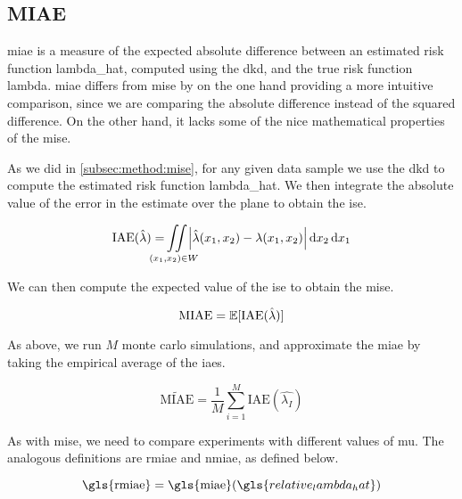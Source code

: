 \subsection{MIAE}
\label{subsec:method:miae}

\Gls{miae} is a measure of the expected absolute difference between an estimated risk function \gls{lambda_hat},
computed using the \gls{dkd}, and the true risk function \gls{lambda}.
\Gls{miae} differs from \gls{mise} by on the one hand providing a more intuitive comparison,
since we are comparing the absolute difference instead of the squared difference.
On the other hand, it lacks some of the nice mathematical properties of the \gls{mise}.

As we did in \autoref{subsec:method:mise}, for any given data sample we use the \gls{dkd} to compute the estimated risk function \gls{lambda_hat}.
We then integrate the absolute value of the error in the estimate over the plane to obtain the \gls{ise}.

\begin{equation}
    \mbox{IAE}(\hat{\lambda}) = 
        \iintW{
            \left| \hat{\lambda}\xvec - \lambda\xvec \right|
        }
\end{equation}

We can then compute the expected value of the \gls{ise} to obtain the \gls{mise}.

\begin{equation}
    \mbox{MIAE} = \mathbb{E} [\mbox{IAE}(\hat{\lambda})]
\end{equation}

As above, we run $M$ monte carlo simulations,
and approximate the \gls{miae} by taking the empirical average of the \glspl{iae}.

\begin{equation}
    \widetilde{\mbox{MIAE}} = \frac{1}{M} \sum_{i=1}^{M} \mbox{IAE}(\hat{\lambda_I})
\end{equation}

As with \gls{mise}, we need to compare experiments with different values of \gls{mu}.
The analogous definitions are \gls{rmiae} and \gls{nmiae}, as defined below.

\begin{equation}
\label{eq:rmiae}
    \mbox{\gls{rmiae}} = 
        \mbox{\gls{miae}}(\gls{relative_lambda_hat}) \\
\end{equation}

